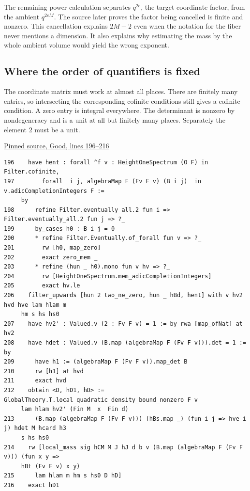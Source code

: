 \documentclass[12pt,letterpaper]{article}
\begin{document}
The remaining power calculation separates \(q^{2e}\), the target-coordinate factor, from the ambient \(q^{2eM}\). The source later proves the factor being cancelled is finite and nonzero. This cancellation explains \(2M-2\) even when the notation for the fiber never mentions a dimension. It also explains why estimating the mass by the whole ambient volume would yield the wrong exponent.

\clearpage\subsection*{Where the order of quantifiers is fixed}

The coordinate matrix must work at almost all places. There are finitely many entries, so intersecting the corresponding cofinite conditions still gives a cofinite condition. A zero entry is integral everywhere. The determinant is nonzero by nondegeneracy and is a unit at all but finitely many places. Separately the element \(2\) must be a unit.

\par\smallskip\href{https://github.com/nousentllc/riemann-hypothesis/blob/40e56bab026552e089d7afcfeff08d2defb9c005/src/CompanionTheory/SpectralGeometry/LocalGlobalProofs/AdelicAnalysis/RankOneLocalDensityAlmostAll.lean#L196-L216}{\sffamily\small Pinned source, Good, lines 196--216}\par

{\footnotesize\begin{verbatim}
196    have hent : forall ^f v : HeightOneSpectrum (O F) in Filter.cofinite,
197        forall  i j, algebraMap F (Fv F v) (B i j)  in  v.adicCompletionIntegers F :=
     by
198      refine Filter.eventually_all.2 fun i => Filter.eventually_all.2 fun j => ?_
199      by_cases h0 : B i j = 0
200      * refine Filter.Eventually.of_forall fun v => ?_
201        rw [h0, map_zero]
202        exact zero_mem _
203      * refine (hun _ h0).mono fun v hv => ?_
204        rw [HeightOneSpectrum.mem_adicCompletionIntegers]
205        exact hv.le
206    filter_upwards [hun 2 two_ne_zero, hun _ hBd, hent] with v hv2 hvd hve lam hlam m
     hm s hs hs0
207    have hv2' : Valued.v (2 : Fv F v) = 1 := by rwa [map_ofNat] at hv2
208    have hdet : Valued.v (B.map (algebraMap F (Fv F v))).det = 1 := by
209      have h1 := (algebraMap F (Fv F v)).map_det B
210      rw [h1] at hvd
211      exact hvd
212    obtain <D, hD1, hD> := GlobalTheory.T.local_quadratic_density_bound_nonzero F v
     lam hlam hv2' (Fin M  x  Fin d)
213      (B.map (algebraMap F (Fv F v))) (hBs.map _) (fun i j => hve i j) hdet M hcard h3
     s hs hs0
214    rw [local_mass sig hCM M J hJ d b v (B.map (algebraMap F (Fv F v))) (fun x y =>
     hBt (Fv F v) x y)
215      lam hlam m hm s hs0 D hD]
216    exact hD1
\end{verbatim}
}
\end{document}
